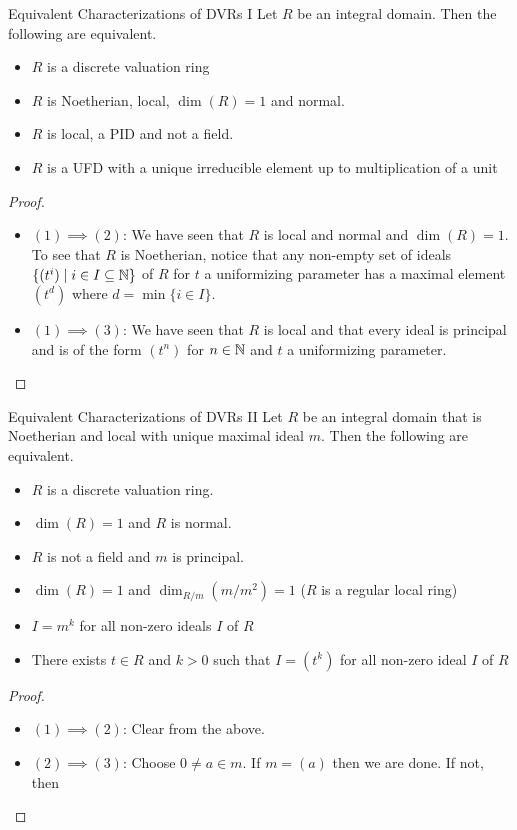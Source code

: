 \documentclass[a4paper]{article}
\begin{document}
\begin{prp}{Equivalent Characterizations of DVRs I}{} Let $R$ be an integral domain. Then the following are equivalent. 
\begin{itemize}
\item $R$ is a discrete valuation ring
\item $R$ is Noetherian, local, $\dim(R)=1$ and normal. 
\item $R$ is local, a PID and not a field. 
\item $R$ is a UFD with a unique irreducible element up to multiplication of a unit
\end{itemize} \tcbline
\begin{proof}~\\
\begin{itemize}
\item $(1)\implies(2)$: We have seen that $R$ is local and normal and $\dim(R)=1$. To see that $R$ is Noetherian, notice that any non-empty set of ideals $\{(t^i)\;|\;i\in I\subseteq\mathbb{N}\}$ of $R$ for $t$ a uniformizing parameter has a maximal element $(t^d)$ where $d=\min\{i\in I\}$. 
\item $(1)\implies(3)$: We have seen that $R$ is local and that every ideal is principal and is of the form $(t^n)$ for $n\in\mathbb{N}$ and $t$ a uniformizing parameter. 

\end{itemize}
\end{proof}
\end{prp}

\begin{prp}{Equivalent Characterizations of DVRs II}{} Let $R$ be an integral domain that is Noetherian and local with unique maximal ideal $m$. Then the following are equivalent. 
\begin{itemize}
\item $R$ is a discrete valuation ring. 
\item $\dim(R)=1$ and $R$ is normal. 
\item $R$ is not a field and $m$ is principal. 
\item $\dim(R)=1$ and $\dim_{R/m}(m/m^2)=1$ ($R$ is a regular local ring)
\item $I=m^k$ for all non-zero ideals $I$ of $R$
\item There exists $t\in R$ and $k>0$ such that $I=(t^k)$ for all non-zero ideal $I$ of $R$
\end{itemize} \tcbline
\begin{proof}~\\
\begin{itemize}
\item $(1)\implies(2)$: Clear from the above. 
\item $(2)\implies(3)$: Choose $0\neq a\in m$. If $m=(a)$ then we are done. If not, then 
\end{itemize}
\end{proof}
\end{prp}
\end{document}

